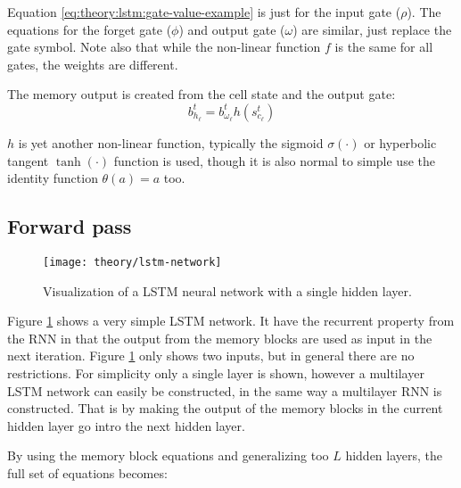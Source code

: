 Equation \eqref{eq:theory:lstm:gate-value-example} is just for the input gate ($\rho$). The equations for the forget gate ($\phi$) and output gate ($\omega$) are similar, just replace the gate symbol. Note also that while the non-linear function $f$ is the same for all gates, the weights are different.

The memory output is created from the cell state and the output gate:
\begin{equation}
b_{h_\ell}^t = b_{\omega_\ell}^t h(s_{c_\ell}^t)
\end{equation}

$h$ is yet another non-linear function, typically the sigmoid $\sigma(\cdot)$ or hyperbolic tangent $\tanh(\cdot)$ function is used, though it is also normal to simple use the identity function $\theta(a) = a$ too.

\newpage
\subsection{Forward pass}

\begin{figure}[h]
	\centering
	\centerline{\texttt{[image: theory/lstm-network]}}
	\caption{Visualization of a LSTM neural network with a single hidden layer.}
	\label{fig:theory:lstm:lstm-network}
\end{figure}

Figure \ref{fig:theory:lstm:lstm-network} shows a very simple LSTM network. It have the recurrent property from the RNN in that the output from the memory blocks are used as input in the next iteration. Figure \ref{fig:theory:lstm:lstm-network} only shows two inputs, but in general there are no restrictions. For simplicity only a single layer is shown, however a multilayer LSTM network can easily be constructed, in the same way a multilayer RNN is constructed. That is by making the output of the memory blocks in the current hidden layer go intro the next hidden layer. 

By using the memory block equations and generalizing too $L$ hidden layers, the full set of equations becomes:

